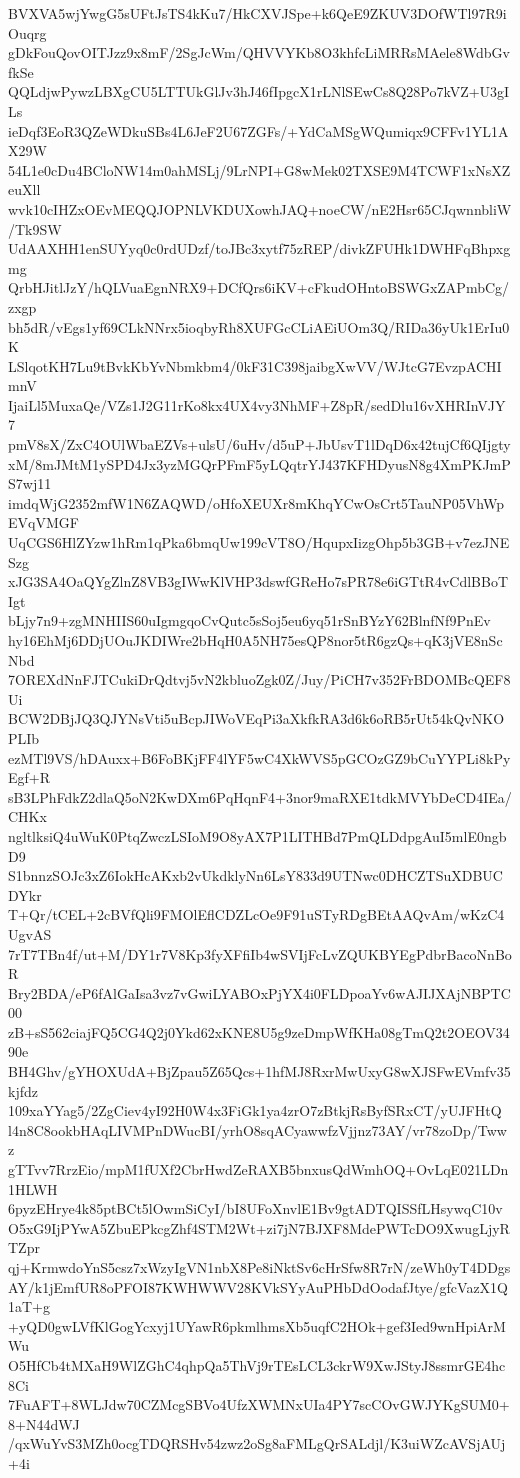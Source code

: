 BVXVA5wjYwgG5sUFtJsTS4kKu7/HkCXVJSpe+k6QeE9ZKUV3DOfWTl97R9iOuqrg
gDkFouQovOITJzz9x8mF/2SgJcWm/QHVVYKb8O3khfcLiMRRsMAele8WdbGvfkSe
QQLdjwPywzLBXgCU5LTTUkGlJv3hJ46fIpgcX1rLNlSEwCs8Q28Po7kVZ+U3gILs
ieDqf3EoR3QZeWDkuSBs4L6JeF2U67ZGFs/+YdCaMSgWQumiqx9CFFv1YL1AX29W
54L1e0cDu4BCloNW14m0ahMSLj/9LrNPI+G8wMek02TXSE9M4TCWF1xNsXZeuXll
wvk10cIHZxOEvMEQQJOPNLVKDUXowhJAQ+noeCW/nE2Hsr65CJqwnnbliW/Tk9SW
UdAAXHH1enSUYyq0c0rdUDzf/toJBc3xytf75zREP/divkZFUHk1DWHFqBhpxgmg
QrbHJitlJzY/hQLVuaEgnNRX9+DCfQrs6iKV+cFkudOHntoBSWGxZAPmbCg/zxgp
bh5dR/vEgs1yf69CLkNNrx5ioqbyRh8XUFGcCLiAEiUOm3Q/RIDa36yUk1ErIu0K
LSlqotKH7Lu9tBvkKbYvNbmkbm4/0kF31C398jaibgXwVV/WJtcG7EvzpACHImnV
IjaiLl5MuxaQe/VZs1J2G11rKo8kx4UX4vy3NhMF+Z8pR/sedDlu16vXHRInVJY7
pmV8sX/ZxC4OUlWbaEZVs+ulsU/6uHv/d5uP+JbUsvT1lDqD6x42tujCf6QIjgty
xM/8mJMtM1ySPD4Jx3yzMGQrPFmF5yLQqtrYJ437KFHDyusN8g4XmPKJmPS7wj11
imdqWjG2352mfW1N6ZAQWD/oHfoXEUXr8mKhqYCwOsCrt5TauNP05VhWpEVqVMGF
UqCGS6HlZYzw1hRm1qPka6bmqUw199cVT8O/HqupxIizgOhp5b3GB+v7ezJNESzg
xJG3SA4OaQYgZlnZ8VB3gIWwKlVHP3dswfGReHo7sPR78e6iGTtR4vCdlBBoTIgt
bLjy7n9+zgMNHIIS60uIgmgqoCvQutc5sSoj5eu6yq51rSnBYzY62BlnfNf9PnEv
hy16EhMj6DDjUOuJKDIWre2bHqH0A5NH75esQP8nor5tR6gzQs+qK3jVE8nScNbd
7OREXdNnFJTCukiDrQdtvj5vN2kbluoZgk0Z/Juy/PiCH7v352FrBDOMBcQEF8Ui
BCW2DBjJQ3QJYNsVti5uBcpJIWoVEqPi3aXkfkRA3d6k6oRB5rUt54kQvNKOPLIb
ezMTl9VS/hDAuxx+B6FoBKjFF4lYF5wC4XkWVS5pGCOzGZ9bCuYYPLi8kPyEgf+R
sB3LPhFdkZ2dlaQ5oN2KwDXm6PqHqnF4+3nor9maRXE1tdkMVYbDeCD4IEa/CHKx
ngltlksiQ4uWuK0PtqZwczLSIoM9O8yAX7P1LITHBd7PmQLDdpgAuI5mlE0ngbD9
S1bnnzSOJc3xZ6IokHcAKxb2vUkdklyNn6LsY833d9UTNwc0DHCZTSuXDBUCDYkr
T+Qr/tCEL+2cBVfQli9FMOlEflCDZLcOe9F91uSTyRDgBEtAAQvAm/wKzC4UgvAS
7rT7TBn4f/ut+M/DY1r7V8Kp3fyXFfiIb4wSVIjFcLvZQUKBYEgPdbrBacoNnBoR
Bry2BDA/eP6fAlGaIsa3vz7vGwiLYABOxPjYX4i0FLDpoaYv6wAJIJXAjNBPTC00
zB+sS562ciajFQ5CG4Q2j0Ykd62xKNE8U5g9zeDmpWfKHa08gTmQ2t2OEOV3490e
BH4Ghv/gYHOXUdA+BjZpau5Z65Qcs+1hfMJ8RxrMwUxyG8wXJSFwEVmfv35kjfdz
109xaYYag5/2ZgCiev4yI92H0W4x3FiGk1ya4zrO7zBtkjRsByfSRxCT/yUJFHtQ
l4n8C8ookbHAqLIVMPnDWucBI/yrhO8sqACyawwfzVjjnz73AY/vr78zoDp/Twwz
gTTvv7RrzEio/mpM1fUXf2CbrHwdZeRAXB5bnxusQdWmhOQ+OvLqE021LDn1HLWH
6pyzEHrye4k85ptBCt5lOwmSiCyI/bI8UFoXnvlE1Bv9gtADTQISSfLHsywqC10v
O5xG9IjPYwA5ZbuEPkcgZhf4STM2Wt+zi7jN7BJXF8MdePWTcDO9XwugLjyRTZpr
qj+KrmwdoYnS5csz7xWzyIgVN1nbX8Pe8iNktSv6cHrSfw8R7rN/zeWh0yT4DDgs
AY/k1jEmfUR8oPFOI87KWHWWV28KVkSYyAuPHbDdOodafJtye/gfcVazX1Q1aT+g
+yQD0gwLVfKlGogYcxyj1UYawR6pkmlhmsXb5uqfC2HOk+gef3Ied9wnHpiArMWu
O5HfCb4tMXaH9WlZGhC4qhpQa5ThVj9rTEsLCL3ckrW9XwJStyJ8ssmrGE4hc8Ci
7FuAFT+8WLJdw70CZMcgSBVo4UfzXWMNxUIa4PY7scCOvGWJYKgSUM0+8+N44dWJ
/qxWuYvS3MZh0ocgTDQRSHv54zwz2oSg8aFMLgQrSALdjl/K3uiWZcAVSjAUj+4i
